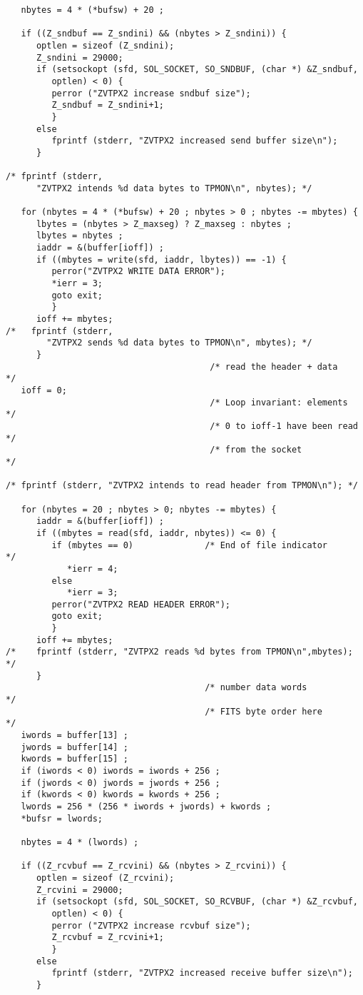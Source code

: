 \begin{center}
\begin{verbatim}
   nbytes = 4 * (*bufsw) + 20 ;

   if ((Z_sndbuf == Z_sndini) && (nbytes > Z_sndini)) {
      optlen = sizeof (Z_sndini);
      Z_sndini = 29000;
      if (setsockopt (sfd, SOL_SOCKET, SO_SNDBUF, (char *) &Z_sndbuf,
         optlen) < 0) {
         perror ("ZVTPX2 increase sndbuf size");
         Z_sndbuf = Z_sndini+1;
         }
      else
         fprintf (stderr, "ZVTPX2 increased send buffer size\n");
      }

/* fprintf (stderr,
      "ZVTPX2 intends %d data bytes to TPMON\n", nbytes); */

   for (nbytes = 4 * (*bufsw) + 20 ; nbytes > 0 ; nbytes -= mbytes) {
      lbytes = (nbytes > Z_maxseg) ? Z_maxseg : nbytes ;
      lbytes = nbytes ;
      iaddr = &(buffer[ioff]) ;
      if ((mbytes = write(sfd, iaddr, lbytes)) == -1) {
         perror("ZVTPX2 WRITE DATA ERROR");
         *ierr = 3;
         goto exit;
         }
      ioff += mbytes;
/*   fprintf (stderr,
        "ZVTPX2 sends %d data bytes to TPMON\n", mbytes); */
      }
                                        /* read the header + data     */
   ioff = 0;
                                        /* Loop invariant: elements   */
                                        /* 0 to ioff-1 have been read */
                                        /* from the socket            */

/* fprintf (stderr, "ZVTPX2 intends to read header from TPMON\n"); */

   for (nbytes = 20 ; nbytes > 0; nbytes -= mbytes) {
      iaddr = &(buffer[ioff]) ;
      if ((mbytes = read(sfd, iaddr, nbytes)) <= 0) {
         if (mbytes == 0)              /* End of file indicator      */
            *ierr = 4;
         else
            *ierr = 3;
         perror("ZVTPX2 READ HEADER ERROR");
         goto exit;
         }
      ioff += mbytes;
/*    fprintf (stderr, "ZVTPX2 reads %d bytes from TPMON\n",mbytes); */
      }
                                       /* number data words          */
                                       /* FITS byte order here       */
   iwords = buffer[13] ;
   jwords = buffer[14] ;
   kwords = buffer[15] ;
   if (iwords < 0) iwords = iwords + 256 ;
   if (jwords < 0) jwords = jwords + 256 ;
   if (kwords < 0) kwords = kwords + 256 ;
   lwords = 256 * (256 * iwords + jwords) + kwords ;
   *bufsr = lwords;

   nbytes = 4 * (lwords) ;

   if ((Z_rcvbuf == Z_rcvini) && (nbytes > Z_rcvini)) {
      optlen = sizeof (Z_rcvini);
      Z_rcvini = 29000;
      if (setsockopt (sfd, SOL_SOCKET, SO_RCVBUF, (char *) &Z_rcvbuf,
         optlen) < 0) {
         perror ("ZVTPX2 increase rcvbuf size");
         Z_rcvbuf = Z_rcvini+1;
         }
      else
         fprintf (stderr, "ZVTPX2 increased receive buffer size\n");
      }


\end{verbatim}
\end{center}
